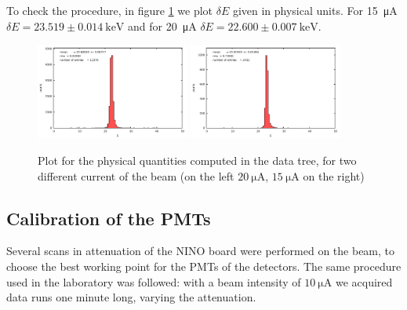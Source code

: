 To check the procedure, in figure \ref{fig:CheckEnmo} we plot $\delta E$ given in physical units. For \SI{15}{\micro \ampere} $\delta E = 23.519 \pm 0.014 \SI{}{\kilo \electronvolt}$ and for \SI{20}{\micro \ampere} $\delta E = 22.600 \pm 0.007 \SI{}{\kilo \electronvolt}$.

\begin{figure}[!ht]
\centering
\includegraphics[width = 0.45\textwidth]{Analysis/ENMOCheck20.pdf}
\includegraphics[width = 0.45\textwidth]{Analysis/ENMOCheck15.pdf} 
\caption{Plot for the physical quantities computed in the data tree, for two different current of the beam (on the left $\SI{20}{\micro \ampere}$, $\SI{15}{\micro \ampere}$ on the right)}
\label{fig:CheckEnmo}
\end{figure}

\newpage
\subsection{Calibration of the PMTs} \label{PMTsCalib}

Several scans in attenuation of the NINO board were performed on the beam, to choose the best working point for the PMTs of the detectors. The same procedure used in the laboratory was followed: with a beam intensity of $\SI{10}{\micro \ampere}$ we acquired data runs one minute long, varying the attenuation. 

